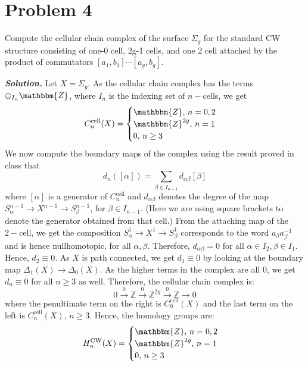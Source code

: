 \documentclass[11pt]{article}
\newcommand{\bb}[1]{\mathbb{#1}}
\newcommand{\Z}{\bb{Z}}
\newcommand{\sol}{ \textbf{\textit{Solution.}} }
\begin{document}
 \section{Problem 4}

 \begin{prob}{}{}
    Compute the cellular chain complex of the surface $\Sigma_{g}$ for the standard $\mathrm{CW}$ structure consisting of one-0 cell, $2 \mathrm{g}$-1 cells, and one 2 cell attached by the product of commutators $\left[a_{1}, b_{1}\right] \cdots\left[a_{g}, b_{g}\right]$.
 \end{prob}
 \sol   Let \( X = \Sigma_g \). As the cellular chain complex has the terms \( \oplus_{I_n}\mathbbm{Z} \), where \( I_n \) is the indexing set of \( n- \)cells, we get
 \[
   C_n^{\textrm{cell}}(X) =
   \begin{cases}
     \mathbbm{Z}, \, n = 0,2    \\
     \mathbbm{Z}^{2g}, \, n = 1 \\
     0, \, n \geq 3
   \end{cases}
 \]
 We now compute the boundary maps of the complex using the result proved in class that
 \[
   d_{n}([\alpha]) = \sum_{\beta \in I_{n-1}} d_{\alpha\beta}[\beta]
 \]
 \noindent where \( [\alpha] \) is a generator of \( C_{n}^{\textrm{cell}} \) and \( d_{\alpha\beta} \) denotes the degree of the map \( S^{n-1}_\alpha \to X^{n-1} \to S^{n-1}_\beta \), for \( \beta \in I_{n-1} \). (Here we are using square brackets to denote the generator obtained from that cell.)
 From the attaching map of the \( 2- \)cell, we get the composition \( S^{1}_\alpha \to X^{1} \to S^{1}_\beta \) corresponds to the word \( a_{\beta}a_{\beta}^{-1} \) and is hence nullhomotopic, for all \( \alpha, \beta \). Therefore, \( d_{\alpha\beta} = 0 \) for all \( \alpha \in I_{2}, \beta \in I_1 \). Hence, \( d_2 \equiv 0 \). As \( X \) is path connected, we get \( d_1 \equiv 0 \) by looking at the boundary map \( \Delta_1(X) \to \Delta_0(X) \). As the higher terms in the complex are all 0, we get \( d_n \equiv 0 \) for all \( n \geq 3 \) as well. Therefore, the cellular chain complex is:
 \[0\xrightarrow{0}\Z \xrightarrow{0}\Z^{2g}\xrightarrow{0}\Z\to 0\]
 where the penultimate term on the right is \( C_0^{\textrm{cell}}(X) \) and the last term on the left is \( C_n^{\textrm{cell}}(X) \), \( n \geq 3 \). Hence, the homology groups are:
 \[
   H_n^{\textrm{CW}} (X) =
   \begin{cases}
     \mathbbm{Z}, \, n = 0,2    \\
     \mathbbm{Z}^{2g}, \, n = 1 \\
     0, \, n \geq 3
   \end{cases}
 \]
\end{document}
